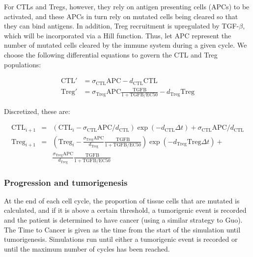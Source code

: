\documentclass{article}
\begin{document}
For CTLs and Tregs, however, they rely on antigen presenting cells (APCs) to be activated, and these APCs in turn rely on mutated cells being cleared so that they can bind antigens.
In addition, Treg recruitment is upregulated by TGF-$\beta$, which will be incorporated via a Hill function.
Thus, let $\text{APC}$ represent the number of mutated cells cleared by the immune system during a given cycle.
We choose the following differential equations to govern the CTL and Treg populations:

\begin{align*}
\text{CTL}' & = \sigma_{\text{CTL}}\text{APC} - d_{\text{CTL}}\text{CTL} \\
\text{Treg}' & = \sigma_{\text{Treg}}\text{APC} \frac{\text{TGFB}}{1+\text{TGFB}/\text{EC50}}- d_{\text{Treg}}\text{Treg}
\end{align*}

Discretized, these are:

\begin{align*}
\text{CTL}_{i+1} & = & \left (\text{CTL}_i-\sigma_{\text{CTL}}\text{APC}/d_{\text{CTL}}\right )\exp(- d_{\text{CTL}}\Delta t) + \sigma_{\text{CTL}}\text{APC}/d_{\text{CTL}}\\
\text{Treg}_{i+1} & = & \left (\text{Treg}_i-\frac{\sigma_{\text{Treg}}\text{APC}}{d_{\text{Treg}}} \frac{\text{TGFB}}{1+\text{TGFB}/\text{EC50}}\right )\exp(-d_{\text{Treg}}\text{Treg}\Delta t)+\\
& & \frac{\sigma_{\text{Treg}}\text{APC}}{d_{\text{Treg}}} \frac{\text{TGFB}}{1+\text{TGFB}/\text{EC50}}
\end{align*}

\subsubsection{Progression and tumorigenesis}
At the end of each cell cycle, the proportion of tissue cells that are mutated is calculated, and if it is above a certain threshold, a tumorigenic event is recorded and the patient is determined to have cancer (using a similar strategy to Guo). The Time to Cancer is given as the time from the start of the simulation until tumorigenesis. Simulations run until either a tumorigenic event is recorded or until the maximum number of cycles has been reached.
\end{document}
